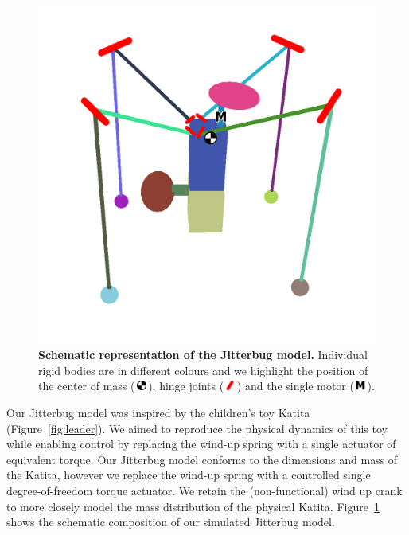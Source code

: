 \documentclass[letterpaper, 10 pt, conference]{ieeeconf}
\newcommand{\com}{\,\includegraphics[width=9pt]{ico-com}\,}
\newcommand{\hinge}{\,\includegraphics[width=9pt]{ico-hinge}\,}
\newcommand{\motor}{\,\includegraphics[width=9pt]{ico-motor}\,}
\begin{document}
\begin{figure}[t]
    \centering
    \includegraphics[width=\linewidth]{fig-jitterbug-parts}
    \caption[
        Schematic representation of the Jitterbug model.
        Individual rigid bodies are in different colours and we highlight the position of the center of mass, hinge joints and the single motor.
    ]{
        \textbf{Schematic representation of the Jitterbug model.}
        Individual rigid bodies are in different colours and we highlight the position of the center of mass (\protect\com), hinge joints  (\protect\hinge) and the single motor (\protect\motor).
    }
    \label{fig:parts}
\end{figure}

Our Jitterbug model was inspired by the children's toy Katita (Figure~\ref{fig:leader}).
We aimed to reproduce the physical dynamics of this toy while enabling control by replacing the wind-up spring with a single actuator of equivalent torque.
Our Jitterbug model conforms to the dimensions and mass of the Katita, however we replace the wind-up spring with a controlled single degree-of-freedom torque actuator.
We retain the (non-functional) wind up crank to more closely model the mass distribution of the physical Katita.
Figure~\ref{fig:parts} shows the schematic composition of our simulated Jitterbug model.
\end{document}
